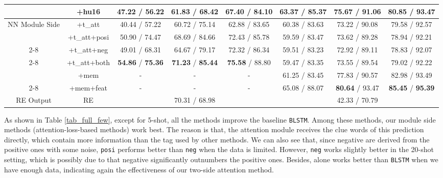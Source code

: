\begin{table*}
{\begin{tabular}{|c|c|c|c|c|c|c|c|}
\rowcolor{Gray} \multirow{-2}{*}{Output Side}& +hu16 & 47.22 / 56.22 & 61.83 / 68.42 & 67.40 / 84.10
& 63.37 / 85.37 & 75.67 / 91.06 & 80.85 / 93.47  \\
\hline
\multirow{2}{*}{\vspace{-2.2em}NN Module Side} & +t\_att & 40.44 / 57.22 & 60.72 / 75.14 & 62.88 / 83.65
& 60.38 / 83.63 & 73.22 / 90.08 & 79.58 / 92.57  \\
\cline{2-8}
& +t\_att+posi & 50.90 / 74.47 & 68.69 / 84.66 & 72.43 / 85.78
& 59.59 / 83.47 & 73.62 / 89.28 & 78.94 / 92.21 \\
\cline{2-8}
& +t\_att+neg & 49.01 / 68.31 & 64.67 / 79.17 & 72.32 / 86.34
& 59.51 / 83.23 & 72.92 / 89.11 & 78.83 / 92.07 \\
\cline{2-8}
& +t\_att+both & \textbf{54.86} / \textbf{75.36} & \textbf{71.23} / \textbf{85.44} & \textbf{75.58} / 88.80
& 59.47 / 83.35 & 73.55 / 89.54 & 79.02 / 92.22 \\
\hline
\rowcolor{Gray} & +mem & - & - & - & 61.25 / 83.45 & 77.83 / 90.57 & 82.98 / 93.49 \\
\cline{2-8}
\rowcolor{Gray} \multirow{-2}{*}{Few-Shot Model}  & +mem+feat & - & - & - & 65.08 / 88.07 & \textbf{80.64} / 93.47 & \textbf{85.45} / \textbf{95.39} \\
\hline
\hline
RE Output & RE & \multicolumn{3}{|c|}{70.31 / 68.98} & \multicolumn{3}{|c|}{42.33 / 70.79} \\
\hline
\end{tabular}
}
\caption{Results on Full Few-Shot Learning Setting}
\label{tab_full_few}
\end{table*}

As shown in Table \ref{tab_full_few}, except for 5-shot, all the methods improve the baseline \texttt{BLSTM}.
Among these methods, our \NN module side methods (attention-loss-based methods) work best.
The reason is that, the attention module receives the clue words of this prediction directly, which contain more information than the \RE tag used by other methods.
We can also see that, since negative \REs are derived from the positive ones with some noise, \texttt{posi} performs better than \texttt{neg} when the data is limited.
However, \texttt{neg} works slightly better in the 20-shot setting, which is possibly due to that negative \REs significantly outnumbers the positive ones.
Besides, \tatt alone works better than \texttt{BLSTM} when we have enough data, indicating again the effectiveness of our two-side attention method.

